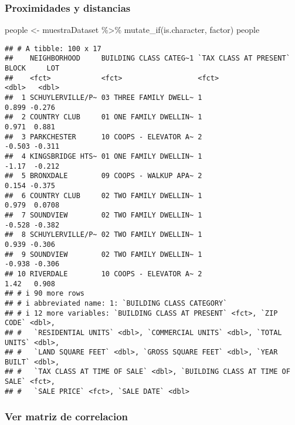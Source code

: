 \documentclass[
]{article}
\newenvironment{Shaded}{\begin{snugshade}}{\end{snugshade}}
\newcommand{\FunctionTok}[1]{\textcolor[rgb]{0.00,0.00,0.00}{#1}}
\newcommand{\NormalTok}[1]{#1}
\newcommand{\OtherTok}[1]{\textcolor[rgb]{0.56,0.35,0.01}{#1}}
\newcommand{\SpecialCharTok}[1]{\textcolor[rgb]{0.00,0.00,0.00}{#1}}
\begin{document}
\hypertarget{proximidades-y-distancias}{%
\subsubsection{Proximidades y
distancias}\label{proximidades-y-distancias}}

\begin{Shaded}
\begin{Highlighting}[]
\NormalTok{people }\OtherTok{\textless{}{-}}\NormalTok{ muestraDataset }\SpecialCharTok{\%\textgreater{}\%} \FunctionTok{mutate\_if}\NormalTok{(is.character, factor)}
\NormalTok{people}
\end{Highlighting}
\end{Shaded}

\begin{verbatim}
## # A tibble: 100 x 17
##    NEIGHBORHOOD     BUILDING CLASS CATEG~1 `TAX CLASS AT PRESENT`  BLOCK     LOT
##    <fct>            <fct>                  <fct>                   <dbl>   <dbl>
##  1 SCHUYLERVILLE/P~ 03 THREE FAMILY DWELL~ 1                       0.899 -0.276 
##  2 COUNTRY CLUB     01 ONE FAMILY DWELLIN~ 1                       0.971  0.881 
##  3 PARKCHESTER      10 COOPS - ELEVATOR A~ 2                      -0.503 -0.311 
##  4 KINGSBRIDGE HTS~ 01 ONE FAMILY DWELLIN~ 1                      -1.17  -0.212 
##  5 BRONXDALE        09 COOPS - WALKUP APA~ 2                       0.154 -0.375 
##  6 COUNTRY CLUB     02 TWO FAMILY DWELLIN~ 1                       0.979  0.0708
##  7 SOUNDVIEW        02 TWO FAMILY DWELLIN~ 1                      -0.528 -0.382 
##  8 SCHUYLERVILLE/P~ 02 TWO FAMILY DWELLIN~ 1                       0.939 -0.306 
##  9 SOUNDVIEW        02 TWO FAMILY DWELLIN~ 1                      -0.938 -0.306 
## 10 RIVERDALE        10 COOPS - ELEVATOR A~ 2                       1.42   0.908 
## # i 90 more rows
## # i abbreviated name: 1: `BUILDING CLASS CATEGORY`
## # i 12 more variables: `BUILDING CLASS AT PRESENT` <fct>, `ZIP CODE` <dbl>,
## #   `RESIDENTIAL UNITS` <dbl>, `COMMERCIAL UNITS` <dbl>, `TOTAL UNITS` <dbl>,
## #   `LAND SQUARE FEET` <dbl>, `GROSS SQUARE FEET` <dbl>, `YEAR BUILT` <dbl>,
## #   `TAX CLASS AT TIME OF SALE` <dbl>, `BUILDING CLASS AT TIME OF SALE` <fct>,
## #   `SALE PRICE` <fct>, `SALE DATE` <dbl>
\end{verbatim}

\hypertarget{ver-matriz-de-correlacion}{%
\subsubsection{Ver matriz de
correlacion}\label{ver-matriz-de-correlacion}}
\end{document}
